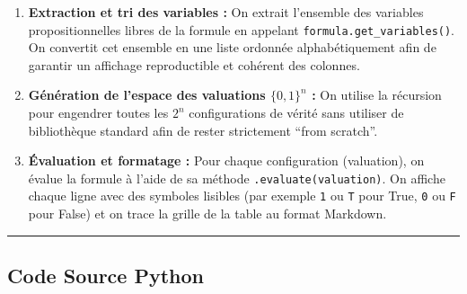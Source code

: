 \documentclass[11pt,a4paper]{article}
\begin{document}
\begin{enumerate}
\def\labelenumi{\arabic{enumi}.}
\tightlist
\item
  \textbf{Extraction et tri des variables :} On extrait l'ensemble des
  variables propositionnelles libres de la formule en appelant
  \texttt{formula.get\_variables()}. On convertit cet ensemble en une
  liste ordonnée alphabétiquement afin de garantir un affichage
  reproductible et cohérent des colonnes.
\item
  \textbf{Génération de l'espace des valuations \(\{0, 1\}^n\) :} On
  utilise la récursion pour engendrer toutes les \(2^n\) configurations
  de vérité sans utiliser de bibliothèque standard afin de rester
  strictement ``from scratch''.
\item
  \textbf{Évaluation et formatage :} Pour chaque configuration
  (valuation), on évalue la formule à l'aide de sa méthode
  \texttt{.evaluate(valuation)}. On affiche chaque ligne avec des
  symboles lisibles (par exemple \texttt{1} ou \texttt{T} pour True,
  \texttt{0} ou \texttt{F} pour False) et on trace la grille de la table
  au format Markdown.
\end{enumerate}

\begin{center}\rule{0.5\linewidth}{0.5pt}\end{center}

\hypertarget{code-source-python}{%
\subsection{Code Source Python}\label{code-source-python}}
\end{document}
